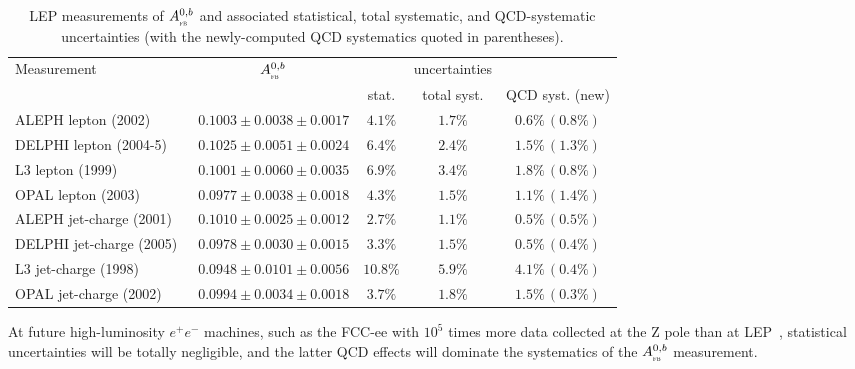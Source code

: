 \documentclass{moriond}
\newcommand{\epem}{e^+e^-}
\newcommand{\AFBb}  {A_{_{\textsc{fb}}}^{0,b}}
\begin{document}
\begin{table}[htbp]
\caption[]{LEP measurements of $\AFBb$  and associated statistical, total systematic, and QCD-systematic uncertainties
(with the newly-computed QCD systematics quoted in parentheses).\label{tab:AFBb}}
\begin{center}
\tabcolsep=1.1mm
\begin{tabular}{lcccc}\hline
Measurement &  $\AFBb$ &  & uncertainties & \\
            &          &  stat. & total syst. & QCD syst. (new)\\\hline
ALEPH lepton (2002)~\cite{leptonALEPH} & $0.1003 \pm 0.0038 \pm 0.0017$ &  $4.1\%$ & $1.7\%$ & $0.6\%\,(0.8\%)$ \\
DELPHI lepton (2004-5)~\cite{leptonDELPHI95} & $0.1025 \pm 0.0051 \pm 0.0024$ & $6.4\%$ & $2.4\%$ & $1.5\%\,(1.3\%)$ \\ 
L3 lepton (1999)~\cite{leptonL392} & $0.1001 \pm 0.0060 \pm 0.0035$ & $6.9\%$ & $3.4\%$ & $1.8\%\,(0.8\%)$\\
OPAL lepton (2003)~\cite{leptonOPAL}& $0.0977 \pm 0.0038 \pm 0.0018$ & $4.3\%$ & $1.5\%$ & $1.1\%\,(1.4\%)$ \\\hline
ALEPH jet-charge (2001)~\cite{jetqALEPH} & $0.1010 \pm 0.0025 \pm 0.0012$ & $2.7\%$ & $1.1\%$ & $0.5\%\,(0.5\%)$ \\
DELPHI jet-charge (2005)~\cite{jetqDELPHI} & $0.0978 \pm 0.0030 \pm 0.0015$ & $3.3\%$ & $1.5\%$& $0.5\%\,(0.4\%)$\\
L3 jet-charge (1998)~\cite{jetqL3} & $0.0948 \pm 0.0101 \pm 0.0056$ & $10.8\%$ & $5.9\%$& $4.1\%\,(0.4\%)$\\ 
OPAL jet-charge (2002)~\cite{jetqOPAL}& $0.0994 \pm 0.0034 \pm 0.0018 $& $3.7\%$ & $1.8\%$& $1.5\%\,(0.3\%)$\\\hline
\end{tabular}
\end{center}
\end{table}
At future high-luminosity $\epem$ machines, such as the FCC-ee with $10^5$ times more data collected
at the Z pole than at LEP~\cite{FCCee}, statistical uncertainties will be totally negligible, and 
the latter QCD effects will dominate the systematics of the $\AFBb$ measurement. 
\end{document}
